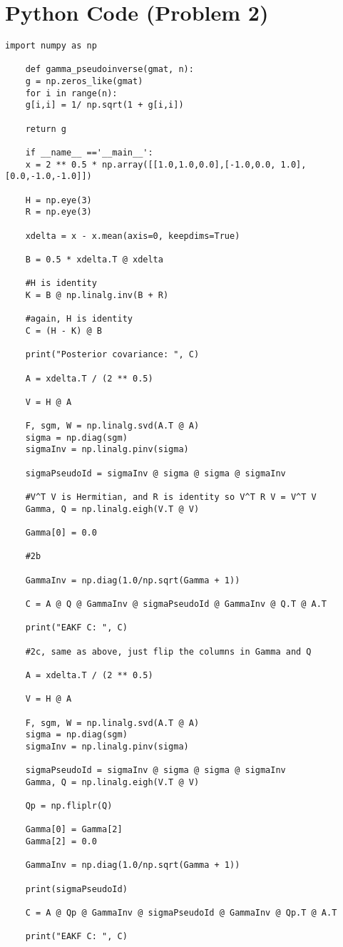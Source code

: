 \documentclass[11pt]{article}
\begin{document}
	\section*{Python Code (Problem 2)}
	\begin{Verbatim}[xleftmargin=-2cm]
	import numpy as np
	
	def gamma_pseudoinverse(gmat, n):
	g = np.zeros_like(gmat)
	for i in range(n):
	g[i,i] = 1/ np.sqrt(1 + g[i,i])
	
	return g
	
	if __name__ =='__main__':
	x = 2 ** 0.5 * np.array([[1.0,1.0,0.0],[-1.0,0.0, 1.0],[0.0,-1.0,-1.0]])
	
	H = np.eye(3)
	R = np.eye(3)
	
	xdelta = x - x.mean(axis=0, keepdims=True)
	
	B = 0.5 * xdelta.T @ xdelta
	
	#H is identity
	K = B @ np.linalg.inv(B + R)
	
	#again, H is identity
	C = (H - K) @ B
	
	print("Posterior covariance: ", C)
	
	A = xdelta.T / (2 ** 0.5)
	
	V = H @ A
	
	F, sgm, W = np.linalg.svd(A.T @ A)
	sigma = np.diag(sgm)
	sigmaInv = np.linalg.pinv(sigma)
	
	sigmaPseudoId = sigmaInv @ sigma @ sigma @ sigmaInv
	
	#V^T V is Hermitian, and R is identity so V^T R V = V^T V
	Gamma, Q = np.linalg.eigh(V.T @ V)
	
	Gamma[0] = 0.0
	
	#2b
	
	GammaInv = np.diag(1.0/np.sqrt(Gamma + 1))
	
	C = A @ Q @ GammaInv @ sigmaPseudoId @ GammaInv @ Q.T @ A.T
	
	print("EAKF C: ", C)
	
	#2c, same as above, just flip the columns in Gamma and Q
	
	A = xdelta.T / (2 ** 0.5)
	
	V = H @ A
	
	F, sgm, W = np.linalg.svd(A.T @ A)
	sigma = np.diag(sgm)
	sigmaInv = np.linalg.pinv(sigma)
	
	sigmaPseudoId = sigmaInv @ sigma @ sigma @ sigmaInv
	Gamma, Q = np.linalg.eigh(V.T @ V)
	
	Qp = np.fliplr(Q)
	
	Gamma[0] = Gamma[2]
	Gamma[2] = 0.0
	
	GammaInv = np.diag(1.0/np.sqrt(Gamma + 1))
	
	print(sigmaPseudoId)
	
	C = A @ Qp @ GammaInv @ sigmaPseudoId @ GammaInv @ Qp.T @ A.T
	
	print("EAKF C: ", C)
	\end{Verbatim}
	
\end{document}

